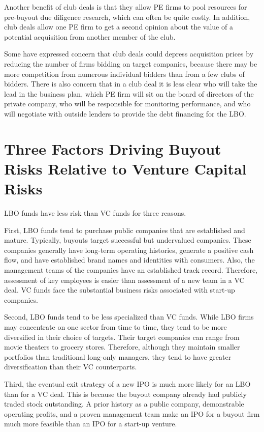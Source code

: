 \documentclass[11pt]{article}
\begin{document}
Another benefit of club deals is that they allow PE firms to pool resources for pre-buyout due diligence research, which can often be quite costly. In addition, club deals allow one PE firm to get a second opinion about the value of a potential acquisition from another member of the club.

Some have expressed concern that club deals could depress acquisition prices by reducing the number of firms bidding on target companies, because there may be more competition from numerous individual bidders than from a few clubs of bidders. There is also concern that in a club deal it is less clear who will take the lead in the business plan, which PE firm will sit on the board of directors of the private company, who will be responsible for monitoring performance, and who will negotiate with outside lenders to provide the debt financing for the LBO.

\section*{Three Factors Driving Buyout Risks Relative to Venture Capital Risks}
LBO funds have less risk than VC funds for three reasons.

First, LBO funds tend to purchase public companies that are established and mature. Typically, buyouts target successful but undervalued companies. These companies generally have long-term operating histories, generate a positive cash flow, and have established brand names and identities with consumers. Also, the management teams of the companies have an established track record. Therefore, assessment of key employees is easier than assessment of a new team in a VC deal. VC funds face the substantial business risks associated with start-up companies.

Second, LBO funds tend to be less specialized than VC funds. While LBO firms may concentrate on one sector from time to time, they tend to be more diversified in their choice of targets. Their target companies can range from movie theaters to grocery stores. Therefore, although they maintain smaller portfolios than traditional long-only managers, they tend to have greater diversification than their VC counterparts.

Third, the eventual exit strategy of a new IPO is much more likely for an LBO than for a VC deal. This is because the buyout company already had publicly traded stock outstanding. A prior history as a public company, demonstrable operating profits, and a proven management team make an IPO for a buyout firm much more feasible than an IPO for a start-up venture.
\end{document}
